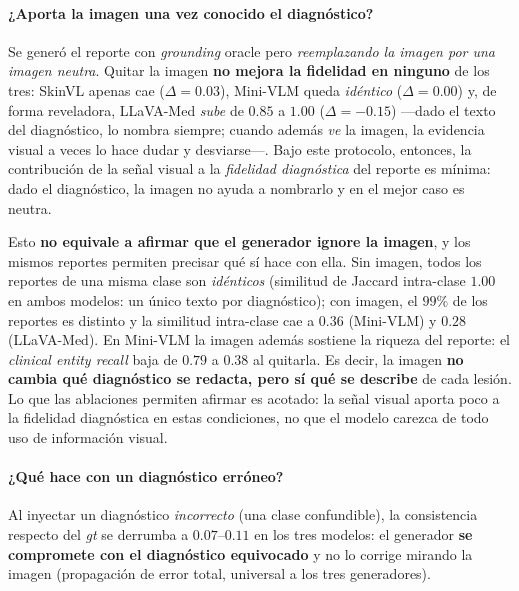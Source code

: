 \documentclass[11pt, a4paper]{article}
\begin{document}
\paragraph{¿Aporta la imagen una vez conocido el diagnóstico?} Se generó el reporte con \emph{grounding} oracle
pero \emph{reemplazando la imagen por una imagen neutra}. Quitar la imagen \textbf{no mejora la
fidelidad en ninguno} de los tres: SkinVL apenas cae ($\Delta=0.03$), Mini-VLM queda \emph{idéntico}
($\Delta=0.00$) y, de forma reveladora, LLaVA-Med \emph{sube} de $0.85$ a $1.00$ ($\Delta=-0.15$) —dado el
texto del diagnóstico, lo nombra siempre; cuando además \emph{ve} la imagen, la evidencia visual a veces
lo hace dudar y desviarse—. Bajo este protocolo, entonces, la contribución de la señal visual a la
\emph{fidelidad diagnóstica} del reporte es mínima: dado el diagnóstico, la imagen no ayuda a nombrarlo y
en el mejor caso es neutra.

Esto \textbf{no equivale a afirmar que el generador ignore la imagen}, y los mismos reportes permiten
precisar qué sí hace con ella. Sin imagen, todos los reportes de una misma clase son \emph{idénticos}
(similitud de Jaccard intra-clase $1.00$ en ambos modelos: un único texto por diagnóstico); con imagen,
el $99\%$ de los reportes es distinto y la similitud intra-clase cae a $0.36$ (Mini-VLM) y $0.28$
(LLaVA-Med). En Mini-VLM la imagen además sostiene la riqueza del reporte: el \emph{clinical entity
recall} baja de $0.79$ a $0.38$ al quitarla. Es decir, la imagen \textbf{no cambia qué diagnóstico se
redacta, pero sí qué se describe} de cada lesión. Lo que las ablaciones permiten afirmar es acotado: la
señal visual aporta poco a la fidelidad diagnóstica en estas condiciones, no que el modelo carezca de todo
uso de información visual.

\paragraph{¿Qué hace con un diagnóstico erróneo?} Al inyectar un diagnóstico \emph{incorrecto} (una clase
confundible), la consistencia respecto del \emph{gt} se derrumba a $0.07$--$0.11$ en los tres modelos: el
generador \textbf{se compromete con el diagnóstico equivocado} y no lo corrige mirando la imagen
(propagación de error total, universal a los tres generadores).
\end{document}

